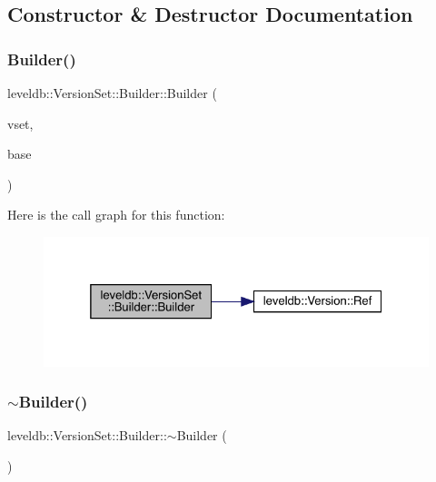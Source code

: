 \subsection{Constructor \& Destructor Documentation}
\mbox{\label{classleveldb_1_1_version_set_1_1_builder_a19d0dd9aec1b825e7d938e9ac24dc4f7}} 
\subsubsection{\texorpdfstring{Builder()}{Builder()}}
{\footnotesize\ttfamily leveldb\+::\+Version\+Set\+::\+Builder\+::\+Builder (\begin{DoxyParamCaption}\item[{\mbox{\hyperlink{classleveldb_1_1_version_set}{Version\+Set}} $\ast$}]{vset,  }\item[{\mbox{\hyperlink{classleveldb_1_1_version}{Version}} $\ast$}]{base }\end{DoxyParamCaption})\hspace{0.3cm}{\ttfamily [inline]}}

Here is the call graph for this function\+:
\nopagebreak
\begin{figure}[H]
\begin{center}
\leavevmode
\includegraphics[width=325pt]{classleveldb_1_1_version_set_1_1_builder_a19d0dd9aec1b825e7d938e9ac24dc4f7_cgraph}
\end{center}
\end{figure}
\mbox{\label{classleveldb_1_1_version_set_1_1_builder_acd7047ca78d8c654967101f53d10792c}} 
\subsubsection{\texorpdfstring{$\sim$Builder()}{~Builder()}}
{\footnotesize\ttfamily leveldb\+::\+Version\+Set\+::\+Builder\+::$\sim$\+Builder (\begin{DoxyParamCaption}{ }\end{DoxyParamCaption})\hspace{0.3cm}{\ttfamily [inline]}}

